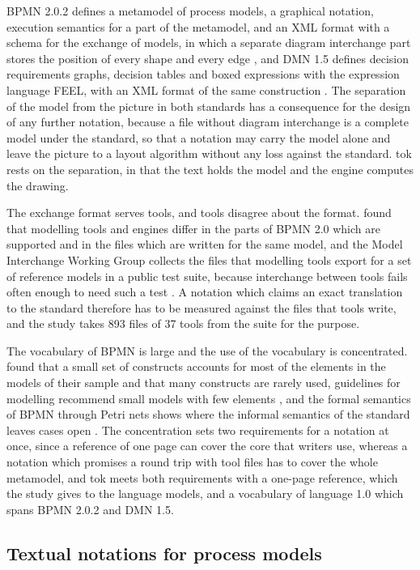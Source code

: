 \documentclass[11pt,a4paper]{article}
\begin{document}
BPMN 2.0.2 defines a metamodel of process models, a graphical notation, execution semantics for a part of the metamodel, and an XML format with a schema for the exchange of models, in which a separate diagram interchange part stores the position of every shape and every edge \citep{OMG2014BPMN}, and DMN 1.5 defines decision requirements graphs, decision tables and boxed expressions with the expression language FEEL, with an XML format of the same construction \citep{OMG2024DMN}. The separation of the model from the picture in both standards has a consequence for the design of any further notation, because a file without diagram interchange is a complete model under the standard, so that a notation may carry the model alone and leave the picture to a layout algorithm without any loss against the standard. tok rests on the separation, in that the text holds the model and the engine computes the drawing.

The exchange format serves tools, and tools disagree about the format. \citet{Geiger2018bpmn} found that modelling tools and engines differ in the parts of BPMN 2.0 which are supported and in the files which are written for the same model, and the Model Interchange Working Group collects the files that modelling tools export for a set of reference models in a public test suite, because interchange between tools fails often enough to need such a test \citep{MIWG}. A notation which claims an exact translation to the standard therefore has to be measured against the files that tools write, and the study takes 893 files of 37 tools from the suite for the purpose.

The vocabulary of BPMN is large and the use of the vocabulary is concentrated. \citet{zurMuehlen2008} found that a small set of constructs accounts for most of the elements in the models of their sample and that many constructs are rarely used, guidelines for modelling recommend small models with few elements \citep{Mendling2010}, and the formal semantics of BPMN through Petri nets shows where the informal semantics of the standard leaves cases open \citep{Dijkman2008}. The concentration sets two requirements for a notation at once, since a reference of one page can cover the core that writers use, whereas a notation which promises a round trip with tool files has to cover the whole metamodel, and tok meets both requirements with a one-page reference, which the study gives to the language models, and a vocabulary of language 1.0 which spans BPMN 2.0.2 and DMN 1.5.

\subsection{Textual notations for process models}
\end{document}
